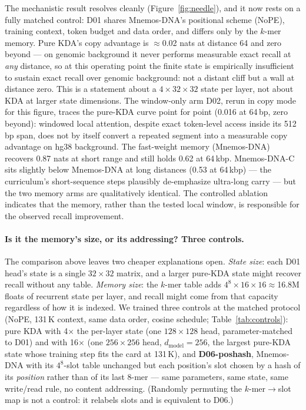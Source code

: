 \documentclass[11pt]{article}
\theoremstyle{plain}
\begin{document}
The mechanistic result resolves cleanly (Figure~\ref{fig:needle}), and it now rests on a fully
matched control: D01 shares Mnemos-DNA's positional scheme (NoPE), training context, token
budget and data order, and differs only by the $k$-mer memory. Pure KDA's copy advantage is
$\approx$0.02 nats at distance 64 and zero beyond --- on genomic background it never performs
measurable exact recall at \emph{any} distance, so at this operating point the finite state is empirically
insufficient to sustain exact recall over genomic background: not a distant cliff but a wall at
distance zero. This is a statement about a $4\times32\times32$ state per layer, not about KDA at
larger state dimensions. The window-only arm D02, rerun in copy mode for this
figure, traces the pure-KDA curve point for point (0.016 at 64\,bp, zero beyond): windowed local
attention, despite exact token-level access inside its 512\,bp span, does not by itself convert
a repeated segment into a measurable copy advantage on hg38 background. The fast-weight memory
(Mnemos-DNA) recovers 0.87 nats at short
range and still holds 0.62 at 64\,kbp. Mnemos-DNA-C sits slightly below Mnemos-DNA at long distances (0.53 at
64\,kbp) --- the curriculum's short-sequence steps plausibly de-emphasize ultra-long carry ---
but the two memory arms are qualitatively identical. The controlled ablation indicates that the
memory, rather than the tested local window, is responsible for the observed recall improvement.

\paragraph{Is it the memory's size, or its addressing? Three controls.} The comparison above
leaves two cheaper explanations open. \emph{State size}: each D01 head's state is a single
$32\times32$ matrix, and a larger pure-KDA state might recover recall without any table.
\emph{Memory size}: the $k$-mer table adds $4^8\times16\times16\approx$16.8M floats of recurrent
state per layer, and recall might come from that capacity regardless of how it is indexed. We
trained three controls at the matched protocol (NoPE, 131\,K context, same data order, cosine
schedule; Table~\ref{tab:controls}): pure KDA with 4$\times$ the per-layer state (one
$128\times128$ head, parameter-matched to D01) and with 16$\times$ (one $256\times256$ head,
$d_{\text{model}}{=}256$, the largest pure-KDA state whose training step fits the card at
131\,K), and \textbf{D06-poshash}, Mnemos-DNA with its $4^8$-slot table unchanged but each
position's slot chosen by a hash of its \emph{position} rather than of its last 8-mer --- same
parameters, same state, same write/read rule, no content addressing. (Randomly permuting the
$k$-mer$\to$slot map is not a control: it relabels slots and is equivalent to D06.)
\end{document}
